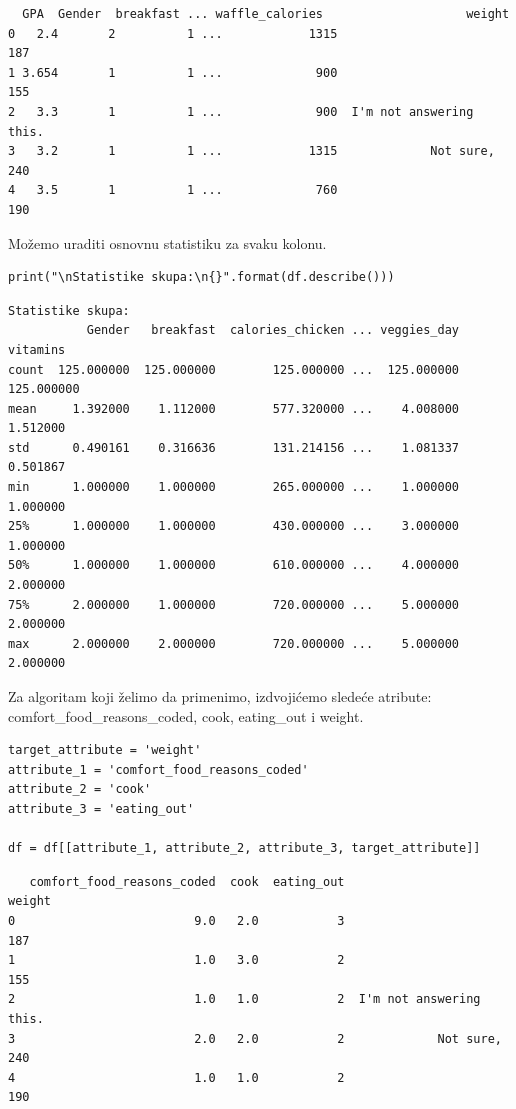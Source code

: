 \documentclass[12pt,a4paper]{article}
\begin{document}
\begin{verbatim}
  GPA  Gender  breakfast ... waffle_calories                    weight
0   2.4       2          1 ...            1315                       187
1 3.654       1          1 ...             900                       155
2   3.3       1          1 ...             900  I'm not answering this.
3   3.2       1          1 ...            1315             Not sure, 240
4   3.5       1          1 ...             760                       190
\end{verbatim}

Mo\v zemo uraditi osnovnu statistiku za svaku kolonu.

\begin{lstlisting}[mathescape=true]
print("\nStatistike skupa:\n{}".format(df.describe()))
\end{lstlisting}

\begin{verbatim}
Statistike skupa:
           Gender   breakfast  calories_chicken ... veggies_day    vitamins
count  125.000000  125.000000        125.000000 ...  125.000000  125.000000
mean     1.392000    1.112000        577.320000 ...    4.008000    1.512000
std      0.490161    0.316636        131.214156 ...    1.081337    0.501867
min      1.000000    1.000000        265.000000 ...    1.000000    1.000000
25%      1.000000    1.000000        430.000000 ...    3.000000    1.000000
50%      1.000000    1.000000        610.000000 ...    4.000000    2.000000
75%      2.000000    1.000000        720.000000 ...    5.000000    2.000000
max      2.000000    2.000000        720.000000 ...    5.000000    2.000000
\end{verbatim}

Za algoritam koji \v zelimo da primenimo, izdvoji\' cemo slede\' ce atribute: comfort\_food\_reasons\_coded, cook, eating\_out i weight.

\begin{lstlisting}[mathescape=true]
target_attribute = 'weight'
attribute_1 = 'comfort_food_reasons_coded'
attribute_2 = 'cook'
attribute_3 = 'eating_out'

df = df[[attribute_1, attribute_2, attribute_3, target_attribute]]
\end{lstlisting}

\begin{verbatim}
   comfort_food_reasons_coded  cook  eating_out                    weight
0                         9.0   2.0           3                       187
1                         1.0   3.0           2                       155
2                         1.0   1.0           2  I'm not answering this.
3                         2.0   2.0           2             Not sure, 240
4                         1.0   1.0           2                       190
\end{verbatim}
\end{document}
